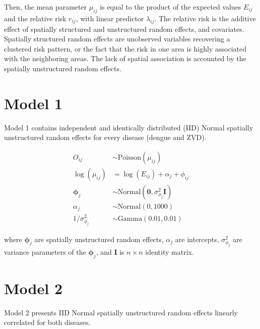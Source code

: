 \documentclass[10pt,letterpaper]{article}
\begin{document}
Then, the mean parameter $\mu_{ij}$ is equal to the product of the expected values $E_{ij}$ and the relative risk $r_{ij}$, with linear predictor $\lambda_{ij}$. 
The relative risk is the additive effect of spatially structured and unstructured random effects, and covariates.  Spatially structured random effects are unobserved variables recovering a clustered risk pattern, or the fact that the risk in one area is highly associated with the neighboring areas. The lack of spatial association is accounted by the spatially unstructured random effects\cite{Banerjee2014}. 

\newpage

\section*{Model 1}
Model 1 contains independent and identically distributed (IID) Normal spatially unstructured random effects for every disease (dengue and ZVD). 

\begin{align*}
O_{ij}                 &\sim \mbox{Poisson}(\mu_{ij})\\
\log(\mu_{ij})         &=    \log(E_{ij}) + \alpha_{j} + \phi_{ij}\\ 
\boldsymbol{\phi}_{j}   &\sim \mbox{Normal}(\mathbf{0}, \sigma^{2}_{\phi_{j}}\mathbf{I})\\ 
\alpha_{j}              &\sim \mbox{Normal}(0,1000)\\
1/\sigma^{2}_{\phi_{j}} &\sim \mbox{Gamma}(0.01, 0.01)
\end{align*}

where $\boldsymbol{\phi}_{j}$ are spatially unstructured random effects, $\alpha_{j}$ are intercepts,  $\sigma^{2}_{\phi_{j}}$ are variance parameters of the $\boldsymbol{\phi}_{j}$, and $\mathbf{I}$ is $n \times n$ identity matrix.
\newpage

\section*{Model 2}
Model 2 presents IID Normal spatially unstructured random effects linearly correlated for both diseases.
\end{document}
